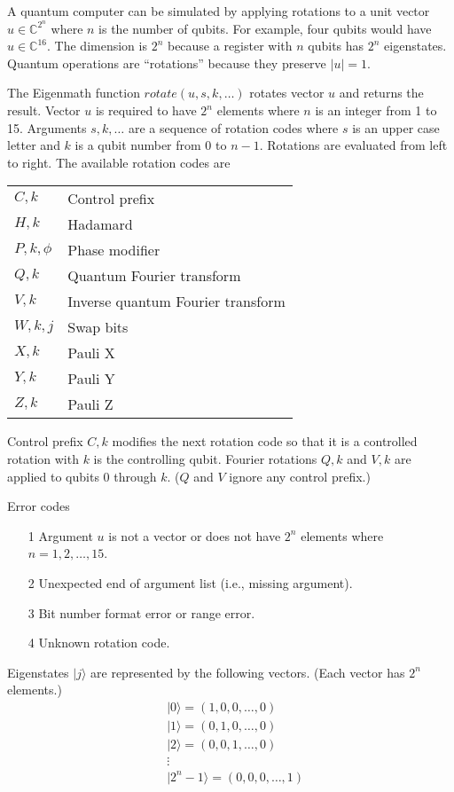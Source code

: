 A quantum computer can be simulated by applying rotations to a
unit vector
$u\in\mathbb{C}^{2^n}$ where $n$ is the number of qubits.
For example, four qubits would have $u\in\mathbb{C}^{16}$.
The dimension is $2^n$ because a register with $n$ qubits
has $2^n$ eigenstates.
Quantum operations are ``rotations'' because they preserve $|u|=1$.

\bigskip
\noindent
The Eigenmath function
$rotate(u,s,k,\ldots)$ rotates vector $u$ and returns the result.
Vector $u$ is required to have $2^n$ elements where $n$ is an
integer from 1 to 15.
Arguments $s,k,\ldots$ are a sequence of rotation codes
where $s$ is an upper case letter and $k$ is a qubit number
from 0 to $n-1$.
Rotations are evaluated from left to right.
The available rotation codes are

\begin{center}
\begin{tabular}{ll}
$C,k$ & Control prefix
\\
$H,k$ & Hadamard
\\
$P,k,\phi$ & Phase modifier
\\
$Q,k$ & Quantum Fourier transform
\\
$V,k$ & Inverse quantum Fourier transform
\\
$W,k,j$ & Swap bits
\\
$X,k$ & Pauli X
\\
$Y,k$ & Pauli Y
\\
$Z,k$ & Pauli Z
\end{tabular}
\end{center}

\noindent
Control prefix $C,k$ modifies the next rotation code so that it
is a controlled rotation with $k$ is the controlling qubit.
Fourier rotations $Q,k$ and $V,k$ are applied to qubits 0 through $k$.
($Q$ and $V$ ignore any control prefix.)

\bigskip
\noindent
Error codes
\begin{itemize}
\item[1] Argument $u$ is not a vector or does not have $2^n$ elements where $n=1,2,\ldots,15$.
\item[2] Unexpected end of argument list (i.e., missing argument).
\item[3] Bit number format error or range error.
\item[4] Unknown rotation code.
\end{itemize}

\bigskip
\noindent
Eigenstates $|j\rangle$ are represented by the following vectors.
(Each vector has $2^n$ elements.)
\begin{align*}
&|0\rangle=(1,0,0,\dots,0)
\\
&|1\rangle=(0,1,0,\ldots,0)
\\
&|2\rangle=(0,0,1,\ldots,0)
\\
&\vdots
\\
&|2^n-1\rangle=(0,0,0,\ldots,1)
\end{align*}

